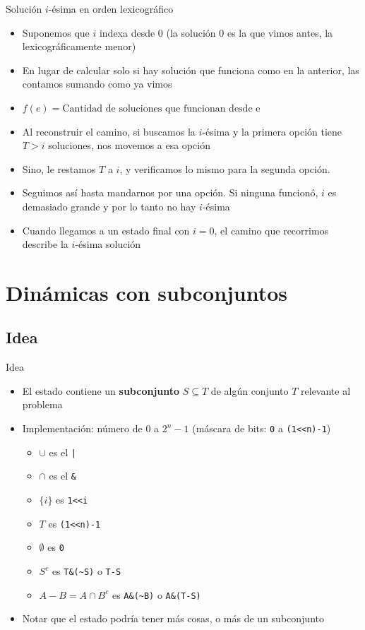 \documentclass{beamer}
\begin{document}
\begin{frame}{Solución $i$-ésima en orden lexicográfico}
	\begin{itemize}
		\item Suponemos que $i$ indexa desde $0$ (la solución $0$ es la que vimos antes, la lexicográficamente menor)
		\item En lugar de calcular solo si hay solución que funciona como en la anterior, las contamos sumando como ya vimos
		\item $f(e) = \mbox{Cantidad de soluciones que funcionan desde e}$
		\item Al reconstruir el camino, si buscamos la $i$-ésima y la primera opción tiene $T > i$ soluciones, nos movemos a esa opción
		\item Sino, le restamos $T$ a $i$, y verificamos lo mismo para la segunda opción.
		\item Seguimos así hasta mandarnos por una opción. Si ninguna funcionó, $i$ es demasiado grande y por lo tanto no hay $i$-ésima
		\item Cuando llegamos a un estado final con $i=0$, el camino que recorrimos describe la $i$-ésima solución
	\end{itemize}
\end{frame}

\section{Dinámicas con subconjuntos}

\subsection{Idea}

\begin{frame}{Idea}
\begin{itemize}
    \item El estado contiene un \textbf{subconjunto} $S \subseteq T$ de algún conjunto $T$ relevante al problema
    \item Implementación: número de $0$ a $2^n-1$ (máscara de bits: \texttt{0} a \texttt{(1<<n)-1})
       \begin{itemize}
		   \item $\cup$ es el \texttt{|}
		   \item $\cap$ es el \texttt{\&}
		   \item $\{ i \}$ es \texttt{1<<i}
		   \item $T$ es \texttt{(1<<n)-1}
		   \item $\emptyset$ es \texttt{0}
		   \item $S^c$ es \texttt{T\&(\textasciitilde S)} o \texttt{T-S}
		   \item $A - B = A \cap B^c$ es \texttt{A\&(\textasciitilde B)} o \texttt{A\&(T-S)}
       \end{itemize}
    \item Notar que el estado podría tener más cosas, o más de un subconjunto
\end{itemize}
\end{frame}
\end{document}
